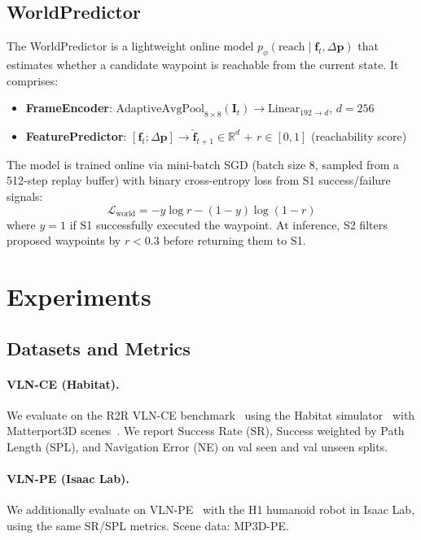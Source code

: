 \documentclass[10pt,twocolumn,letterpaper]{article}
\begin{document}
\subsection{WorldPredictor}
\label{sec:worldpredictor}

The WorldPredictor is a lightweight online model $p_\phi(\text{reach} \mid \mathbf{f}_t, \Delta\mathbf{p})$ that estimates whether a candidate waypoint is reachable from the current state. It comprises:

\begin{itemize}
  \item \textbf{FrameEncoder}: $\text{AdaptiveAvgPool}_{8\times8}(\mathbf{I}_t) \to \text{Linear}_{192 \to d}$, $d=256$
  \item \textbf{FeaturePredictor}: $[\mathbf{f}_t; \Delta\mathbf{p}] \to \hat{\mathbf{f}}_{t+1} \in \mathbb{R}^d$ + $r \in [0,1]$ (reachability score)
\end{itemize}

The model is trained online via mini-batch SGD (batch size 8, sampled from a 512-step replay buffer) with binary cross-entropy loss from S1 success/failure signals:
\begin{equation}
  \mathcal{L}_{\text{world}} = -y \log r - (1-y) \log(1-r)
\end{equation}
where $y=1$ if S1 successfully executed the waypoint. At inference, S2 filters proposed waypoints by $r < 0.3$ before returning them to S1.

\section{Experiments}

\subsection{Datasets and Metrics}

\paragraph{VLN-CE (Habitat).}
We evaluate on the R2R VLN-CE benchmark~\cite{krantz2020vlnce} using the Habitat simulator~\cite{savva2019habitat} with Matterport3D scenes~\cite{chang2017matterport}. We report Success Rate (SR), Success weighted by Path Length (SPL), and Navigation Error (NE) on val seen and val unseen splits.

\paragraph{VLN-PE (Isaac Lab).}
We additionally evaluate on VLN-PE~\cite{internvla2024} with the H1 humanoid robot in Isaac Lab, using the same SR/SPL metrics. Scene data: MP3D-PE.
\end{document}
